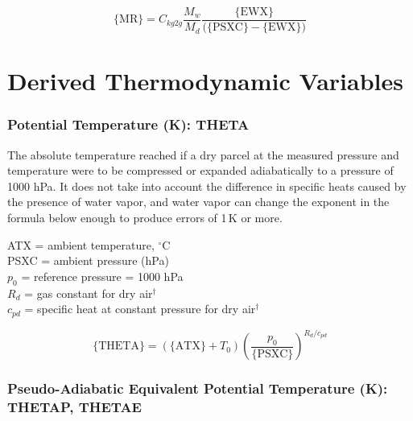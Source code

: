 \documentclass[
  english,
]{book}
\begin{document}
\begin{equation}
\mathrm{\{MR\}}=C_{kg2g}\frac{M_{w}}{M_{d}}\frac{\mathrm{\{EWX\}}}{(\mathrm{\{PSXC\}-\{EWX\})}}
\label{eq:MR}
\end{equation}

\hypertarget{derived-thermodynamic-variables}{%
\section{Derived Thermodynamic Variables}\label{derived-thermodynamic-variables}}

\hypertarget{theta}{%
\subsubsection*{Potential Temperature (K): THETA}\label{theta}}

The absolute temperature reached if a dry parcel at the measured pressure and temperature were to be compressed or expanded adiabatically to a pressure of 1000 hPa. It does not take into account the difference in specific heats caused by the presence of water vapor, and water vapor can change the exponent in the formula below enough to produce errors of 1 K or more.

ATX = ambient temperature, \(^{\circ}\)C\\
PSXC = ambient pressure (hPa)\\
\(p_{0}\) = reference pressure = 1000 hPa\\
\(R_{d}\) = gas constant for dry air\(^{\dagger}\)\\
\(c_{pd}\) = specific heat at constant pressure for dry air\(^{\dagger}\)

\begin{equation}
\mathrm{\{THETA\}}=\left(\mathrm{\{ATX\}}+T_{0}\right)\left(\frac{p_{0}}{\mathrm{\{PSXC\}}}\right)^{R_{d}/c_{pd}}
\label{eq:THETA}
\end{equation}

\hypertarget{thetae}{%
\subsubsection*{Pseudo-Adiabatic Equivalent Potential Temperature (K): THETAP, THETAE}\label{thetae}}
\end{document}
